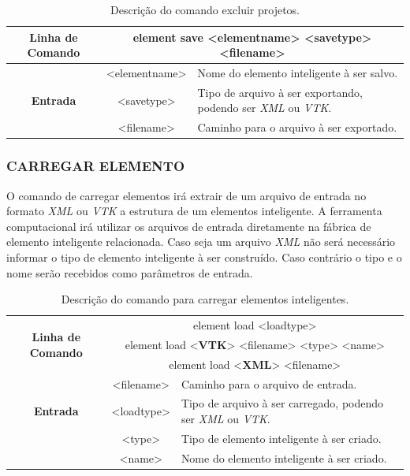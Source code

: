 \documentclass[a4paper,12pt]{monografia}
\theoremstyle{plain}
\theoremstyle{definition}
\theoremstyle{remark}
\begin{document}
\begin{center}
\begin{table}[!htbp]
	\begin{tabular}{|c|c|m{}|}
		\hline
		\textbf{Linha de Comando} & \multicolumn{2}{c|}{element save <element\underline{\space\space}name> <save\underline{\space\space}type> <filename>} \\
		\hline
		\multirow{3}{*}{\textbf{Entrada}} & <element\underline{\space\space}name> & Nome do elemento inteligente à ser salvo. \\
		& <save\underline{\space\space}type> & Tipo de arquivo à ser exportando, podendo ser \textit{XML} ou \textit{VTK}. \\
		& <filename> & Caminho para o arquivo à ser exportado. \\
		\hline
	\end{tabular}
	\caption{Descrição do comando excluir projetos.}
	\label{tab:save_element}
\end{table}
\end{center}

\subsubsection{CARREGAR ELEMENTO}\label{sec:load_element}

O comando de carregar elementos irá extrair de um arquivo de entrada no formato \textit{XML} ou \textit{VTK} a estrutura de um elementos inteligente. A ferramenta computacional irá utilizar os arquivos de entrada diretamente na fábrica de elemento inteligente relacionada. Caso seja um arquivo \textit{XML} não será necessário informar o tipo de elemento inteligente à ser construído. Caso contrário o tipo e o nome serão recebidos como parâmetros de entrada.

\begin{center}
\begin{table}[!htbp]
	\begin{tabular}{|c|c|m{}|}
		\hline
		\multirow{3}{*}{\textbf{Linha de Comando}} & \multicolumn{2}{c|}{element load <load\underline{\space\space}type>} \\
		& \multicolumn{2}{c|}{element load <\textbf{VTK}> <filename> <type> <name>} \\
		& \multicolumn{2}{c|}{element load <\textbf{XML}> <filename>} \\
		\hline
		\multirow{3}{*}{\textbf{Entrada}} & <filename> & Caminho para o arquivo de entrada. \\
		& <load\underline{\space\space}type> & Tipo de arquivo à ser carregado, podendo ser \textit{XML} ou \textit{VTK}. \\
		& <type> & Tipo de elemento inteligente à ser criado. \\
		& <name> & Nome do elemento inteligente à ser criado. \\
		\hline
	\end{tabular}
	\caption{Descrição do comando para carregar elementos inteligentes.}
	\label{tab:load_element}
\end{table}
\end{center}
\end{document}
